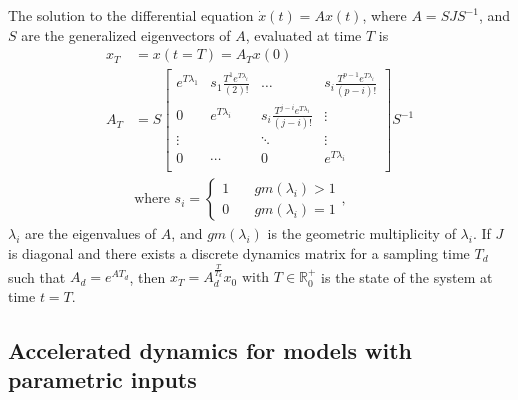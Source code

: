\documentclass[a4paper,UKenglish]{lipics-v2018}
\newcommand{\mat}[1]{{#1}}
\renewcommand{\vec}[1]{{#1}}
\begin{document}
\begin{lemma}
The solution to the differential equation $\dot{\vec{x}}(t)=\mat{A}\vec{x}(t)$, where $\mat{A}=\mat{S}\mat{J}\mat{S}^{-1}$, and $\mat{S}$ are the generalized eigenvectors of $\mat{A}$,
evaluated at time $T$ is
%
\begin{align}
 \vec{x}_T&=\vec{x}(t=T)=\mat{A}_{T}\vec{x} (0)\\
 \mat{A}_{T}&= \mat{S}
 \left [ \begin{array}{cccc}
 e^{T\lambda_1}  & s_1\frac{T^{1}e^{T\lambda_i}}{(2)!} & \hdots  & s_i\frac{T^{p-1}e^{T\lambda_i}}{(p-i)!} \\
0 & e^{T\lambda_i}  & s_i\frac{T^{j-i}e^{T\lambda_i}}{(j-i)!} & \vdots \\
\vdots & & \ddots & \vdots \\
0 & \cdots & 0  &e^{T\lambda_i} \\
\end{array} \right ]
 \mat{S}^{-1}
 \label{eq:continuous_tube_dyn2}\\
 &\text{where } s_i=\left\{\begin{array}{cc}1&\quad gm(\lambda_i)>1\\0&\quad gm(\lambda_i)=1\end{array}\right.,\nonumber
\end{align}
%
$\lambda_i$ are the eigenvalues of $\mat{A}$, and $gm(\lambda_i)$ is the geometric multiplicity of $\lambda_i$.
%
If $\mat{J}$ is diagonal and there exists a discrete dynamics matrix for a sampling time $T_d$ such that $A_d=e^{\mat{A} T_d}$, then $\vec{x}_T=A_d^{\frac{T}{T_d}}\vec{x}_0 \text{ with } T \in \mathbb{R}^+_0$ is the state of the system at time $t=T$. 
\end{lemma}

\subsection{Accelerated dynamics for models with parametric inputs}\label{sec:real_discrete_param_inputs}
\end{document}
